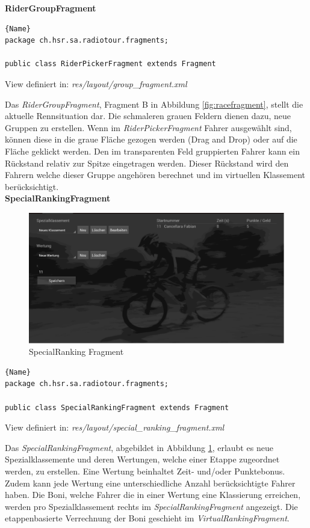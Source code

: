 \textbf{RiderGroupFragment}
\begin{lstlisting}{Name}
package ch.hsr.sa.radiotour.fragments;

public class RiderPickerFragment extends Fragment
\end{lstlisting}


View definiert in:
\textit{res/layout/group\_fragment.xml}

Das \textit{RiderGroupFragment}, Fragment B in Abbildung \ref{fig:racefragment}, stellt die aktuelle Rennsituation dar. Die schmaleren grauen Feldern dienen dazu, neue Gruppen zu erstellen. Wenn im \textit{RiderPickerFragment} Fahrer ausgewählt sind, können diese in die graue Fläche gezogen werden (Drag and Drop) oder auf die Fläche geklickt werden.
Den im transparenten Feld gruppierten Fahrer kann ein Rückstand relativ zur Spitze eingetragen werden. Dieser Rückstand wird den Fahrern welche dieser Gruppe angehören berechnet und im virtuellen Klassement berücksichtigt.
\\

\textbf{SpecialRankingFragment}
\begin{figure}[h!]
\caption{SpecialRanking Fragment}
\label{fig:specialrankingfragment}
\centering
\includegraphics[scale=0.8]{07anhang/images/dev_specialranking.png}
\end{figure}


\begin{lstlisting}{Name}
package ch.hsr.sa.radiotour.fragments;

public class SpecialRankingFragment extends Fragment
\end{lstlisting}

View definiert in:
\textit{res/layout/special\_ranking\_fragment.xml}

Das \textit{SpecialRankingFragment}, abgebildet in Abbildung \ref{fig:specialrankingfragment}, erlaubt es neue Spezialklassemente und deren Wertungen, welche einer Etappe zugeordnet werden, zu erstellen. Eine Wertung beinhaltet Zeit- und/oder Punktebonus. Zudem kann jede Wertung eine unterschiedliche Anzahl berücksichtigte Fahrer haben. Die Boni, welche Fahrer die in einer Wertung eine Klassierung erreichen, werden pro Spezialklassement rechts im \textit{SpecialRankingFragment} angezeigt. Die etappenbasierte Verrechnung der Boni geschieht im \textit{VirtualRankingFragment}.


